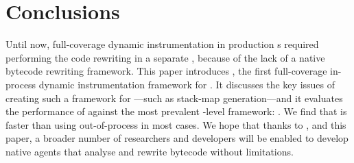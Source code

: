 \section{Conclusions}
\label{sec:jnif-conclusions}

Until now,
full-coverage dynamic instrumentation in production \jvm{}s required performing the code rewriting in a separate \jvm{}, 
because of the lack of a native bytecode rewriting framework.
This paper introduces \jnif{}, the first full-coverage in-process dynamic instrumentation framework for \java{}.
It discusses the key issues of creating such a framework for \java{}---such as stack-map generation---and
it evaluates the performance of \jnif{} against the most prevalent \java{}-level framework: \asm{}.
We find that \jnif{} is faster than using out-of-process \asm{} in most cases.
We hope that thanks to \jnif{}, and this paper, a broader number of researchers and developers will
be enabled to develop native \jvm{} agents that analyse and rewrite \java{} bytecode without limitations.
